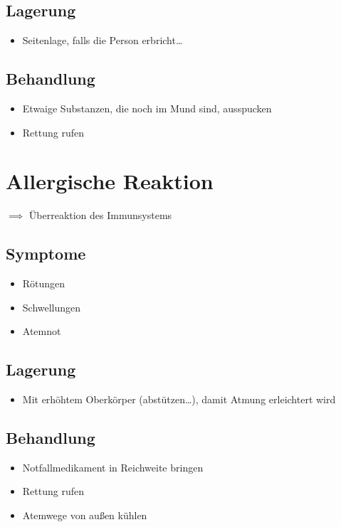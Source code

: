 \section*{Lagerung}
\begin{itemize}
    \item Seitenlage, falls die Person erbricht\dots
\end{itemize}

\section*{Behandlung}
\begin{itemize}
    \item Etwaige Substanzen, die noch im Mund sind, ausspucken
    \item Rettung rufen
\end{itemize}

\chapter{Allergische Reaktion}
$\implies$ Überreaktion des Immunsystems
\section*{Symptome}
\begin{itemize}
    \item Rötungen
    \item Schwellungen
    \item Atemnot
\end{itemize}

\section*{Lagerung}
\begin{itemize}
    \item Mit erhöhtem Oberkörper (abstützen\dots), damit Atmung erleichtert wird
\end{itemize}

\section*{Behandlung}
\begin{itemize}
    \item Notfallmedikament in Reichweite bringen
    \item Rettung rufen
    \item Atemwege von außen kühlen
\end{itemize}